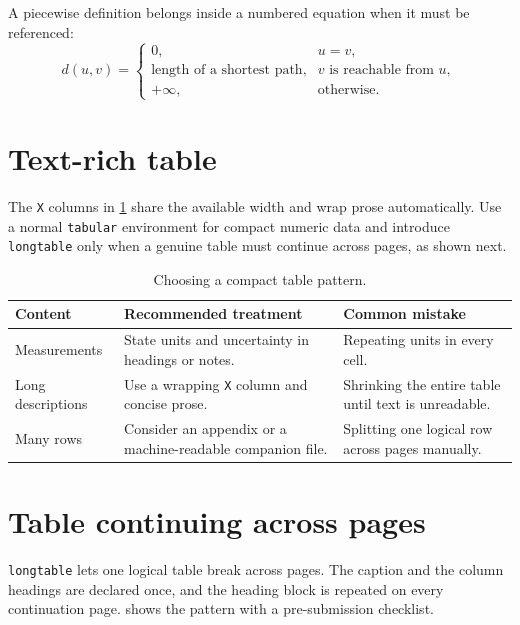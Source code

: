 A piecewise definition belongs inside a numbered equation when it must be
referenced:
\begin{equation}
  d(u,v)=
  \begin{cases}
    0, & u=v,\\
    \text{length of a shortest path}, & v\text{ is reachable from }u,\\
    +\infty, & \text{otherwise}.
  \end{cases}
  \label{eq:pattern-cases}
\end{equation}

\section{Text-rich table}

The \texttt{X} columns in \cref{tab:pattern-guide} share the available width and
wrap prose automatically. Use a normal \texttt{tabular} environment for compact
numeric data and introduce \texttt{longtable} only when a genuine table must
continue across pages, as shown next.

\begin{table}[htbp]
  \centering
  \caption{Choosing a compact table pattern.}
  \label{tab:pattern-guide}
  \begin{tabularx}{\linewidth}{@{}l>{\raggedright\arraybackslash}X>{\raggedright\arraybackslash}X@{}}
    \toprule
    Content & Recommended treatment & Common mistake \\
    \midrule
    Measurements & State units and uncertainty in headings or notes. & Repeating units in every cell. \\
    Long descriptions & Use a wrapping \texttt{X} column and concise prose. & Shrinking the entire table until text is unreadable. \\
    Many rows & Consider an appendix or a machine-readable companion file. & Splitting one logical row across pages manually. \\
    \bottomrule
  \end{tabularx}
\end{table}

\section{Table continuing across pages}

\texttt{longtable} lets one logical table break across pages. The caption and
the column headings are declared once, and the heading block is repeated on every
continuation page.  shows the pattern with a
pre-submission checklist.

